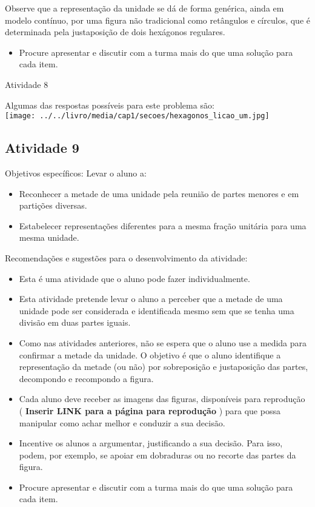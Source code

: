 \documentclass[oneside]{book}
\begin{document}
\begin{multicols}{2}
Observe que a representação da unidade se dá de forma genérica, ainda em modelo contínuo, por uma figura não tradicional como retângulos e círculos, que é determinada pela justaposição de dois hexágonos regulares.

\begin{itemize} %
    \item       Procure apresentar e discutir com a turma mais do que uma solução para cada item.
\end{itemize} %





\begin{resposta*}{Atividade 8}

  Algumas das respostas possíveis para este problema são:\\
    \texttt{[image: ../../livro/media/cap1/secoes/hexagonos\_licao\_um.jpg]}
\end{resposta*}




\subsection{Atividade 9}
  Objetivos específicos: Levar o aluno a:
\begin{itemize} %
    \item       Reconhecer a metade de uma unidade pela reunião de partes menores e em partições diversas.
    \item       Estabelecer representações diferentes para a mesma fração unitária para uma mesma unidade.
\end{itemize} %


  Recomendações e sugestões para o desenvolvimento da atividade:
\begin{itemize} %
    \item       Esta é uma atividade que o aluno pode fazer individualmente.
    \item       Esta atividade pretende levar o aluno a perceber que a metade de uma unidade pode ser considerada e identificada mesmo sem que se tenha uma divisão em duas partes iguais.
    \item       Como nas atividades anteriores, não se espera que o aluno use a medida para confirmar a metade da unidade. O objetivo é que o aluno identifique a representação da metade (ou não) por sobreposição e justaposição das partes, decompondo e recompondo a figura.
    \item       Cada aluno deve receber as imagens das figuras, disponíveis para reprodução (      {\bf Inserir LINK para a página para reprodução}      ) para que possa manipular como achar melhor e conduzir a sua decisão.
    \item       Incentive os alunos a argumentar, justificando a sua decisão. Para isso, podem, por exemplo, se apoiar em dobraduras ou no recorte das partes da figura.
    \item       Procure apresentar e discutir com a turma mais do que uma solução para cada item.
\end{itemize} %






\end{multicols}
\end{document}
